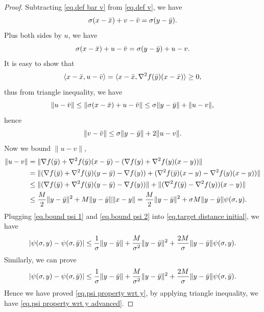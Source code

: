 \documentclass{article}
\numberwithin{equation}{section}
\numberwithin{equation}{section}
\begin{document}
\begin{proof}
    Subtracting \eqref{eq.def bar v} from \eqref{eq.def v}, we have
    \begin{equation*}
        \sigma(x-\Bar{x})+v -\Bar{v} = \sigma(y-\Bar{y}).
    \end{equation*}
    Plus both sides by $u$, we have
    \begin{equation*}
        \sigma(x-\Bar{x})+u-\Bar{v} = \sigma(y-\Bar{y})+u-v.
    \end{equation*}
    It is easy to show that
    \begin{equation*}
        \langle x-\Bar{x},u-\Bar{v}\rangle = \langle x-\Bar{x},\nabla ^2 f(\Bar{y})(x-\Bar{x})\rangle\geq 0,
    \end{equation*}
    thus from triangle inequality, we have
    \begin{equation*}
        \|u-\Bar{v}\| \leq \|\sigma(x-\Bar{x})+u-\Bar{v}\| \leq \sigma \|y-\Bar{y}\|+\|u-v\|,
    \end{equation*}
    hence
    \begin{equation}\label{eq.bound psi 1}
        \|v-\Bar{v}\| \leq \sigma\|y-\Bar{y}\| +2\|u-v\|.
    \end{equation}
    Now we bound $\|u-v\|$,
    \begin{equation}\label{eq.bound psi 2}
        \begin{aligned}
            \|u-v\| & = \|\nabla f(\Bar{y})+\nabla ^2 f(\Bar{y})(x-\Bar{y})-(\nabla f(y) + \nabla ^2 f(y)(x-y))\|                              \\
                    & = \|(\nabla f(\Bar{y})+\nabla^2 f(\Bar{y})(y-\Bar{y})-\nabla f(y))+(\nabla^2 f(\Bar{y})(x-y)-\nabla^2 f(y)(x-y))\|       \\
                    & \leq \|(\nabla f(\Bar{y})+\nabla^2 f(\Bar{y})(y-\Bar{y})-\nabla f(y))\| +\|(\nabla^2 f(\Bar{y})-\nabla^2 f(y))(x-y)\|    \\
                    & \leq \frac{M}{2}\|y-\Bar{y}\|^2+M\|y-\Bar{y}\|\|x-y\|  =\frac{M}{2}\|y-\Bar{y}\|^2+\sigma M \|y-\Bar{y}\|\psi(\sigma,y).
        \end{aligned}
    \end{equation}
    Plugging \eqref{eq.bound psi 1} and \eqref{eq.bound psi 2} into \eqref{eq.target distance initial}, we have
    \begin{equation*}
        \left \vert \psi(\sigma,y)-\psi(\sigma,\Bar{y}) \right\vert \leq \frac{1}{\sigma}\|y-\Bar{y}\| +\frac{M}{\sigma^2}\|y-\Bar{y}\|^2 +\frac{2M}{\sigma}\|y-\Bar{y}\|\psi(\sigma,y).
    \end{equation*}
    Similarly, we can prove
    \begin{equation*}
        \left \vert \psi(\sigma,y)-\psi(\sigma,\Bar{y}) \right\vert \leq \frac{1}{\sigma}\|y-\Bar{y}\| +\frac{M}{\sigma^2}\|y-\Bar{y}\|^2 +\frac{2M}{\sigma}\|y-\Bar{y}\|\psi(\sigma,\Bar{y}).
    \end{equation*}
    Hence we have proved \eqref{eq.psi property wrt y}, by applying triangle inequality, we have \eqref{eq.psi property wrt y advanced}.
\end{proof}
\end{document}
